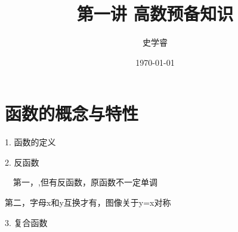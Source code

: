 \documentclass[UTF8]{ctexart}   %
\begin{document}
\title{第一讲 高数预备知识}
\date{\today}
\author{史学睿}
\maketitle

\tableofcontents


\section{函数的概念与特性} 

1. 函数的定义

2. 反函数

\ \ 第一，,但有反函数，原函数不一定单调

第二，字母x和y互换才有，图像关于y=x对称

3. 复合函数
\end{document}
